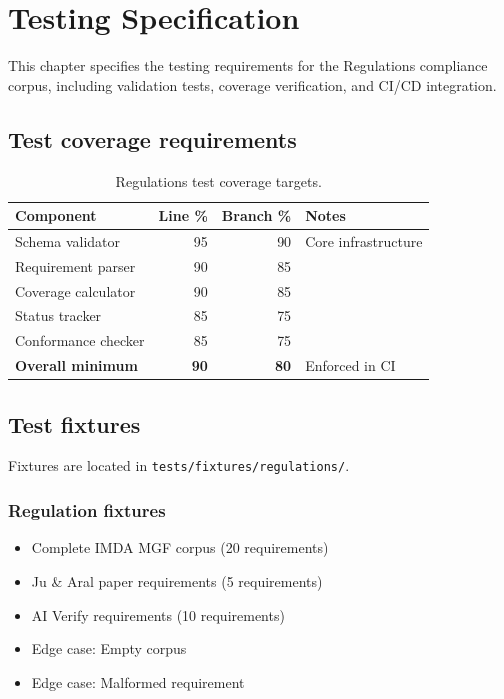 \chapter{Testing Specification}\label{ch:testing}

This chapter specifies the testing requirements for the Regulations compliance
corpus, including validation tests, coverage verification, and CI/CD integration.

\section{Test coverage requirements}

\begin{table}[htbp]
\centering
\caption{Regulations test coverage targets.}
\label{tab:reg-coverage}
\footnotesize
\begin{tabularx}{\linewidth}{@{}l r r X@{}}
\toprule
\textbf{Component} & \textbf{Line \%} & \textbf{Branch \%} & \textbf{Notes} \\ \midrule
Schema validator & 95 & 90 & Core infrastructure \\
Requirement parser & 90 & 85 & \\
Coverage calculator & 90 & 85 & \\
Status tracker & 85 & 75 & \\
Conformance checker & 85 & 75 & \\
\textbf{Overall minimum} & \textbf{90} & \textbf{80} & Enforced in CI \\
\bottomrule
\end{tabularx}
\end{table}

\section{Test fixtures}

Fixtures are located in \texttt{tests/fixtures/regulations/}.

\subsection{Regulation fixtures}

\begin{itemize}
  \item Complete IMDA MGF corpus (20 requirements)
  \item Ju \& Aral paper requirements (5 requirements)
  \item AI Verify requirements (10 requirements)
  \item Edge case: Empty corpus
  \item Edge case: Malformed requirement
\end{itemize}

